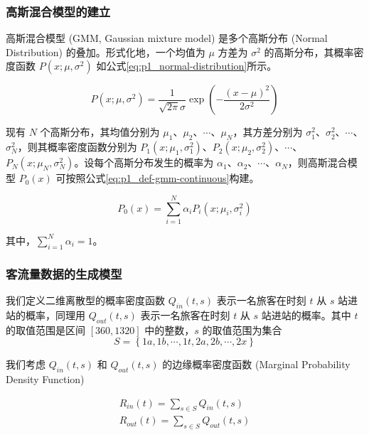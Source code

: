 \documentclass[12pt,a4paper]{mcmthesis}
\begin{document}
    \subsubsection{高斯混合模型的建立}

    高斯混合模型 (GMM, Gaussian mixture model) 是多个高斯分布 (Normal Distribution) 的叠加。形式化地，一个均值为 $\mu$ 方差为 $\sigma^2$ 的高斯分布，其概率密度函数 $P(x;\mu,\sigma^2)$ 如公式\ref{eq:p1_normal-distribution}所示。

    \begin{equation}
        P(x;\mu,\sigma^2) = \frac{1}{\sqrt{2\pi}\sigma} \exp \left( - \frac{(x-\mu)^2}{2\sigma^2} \right)
        \label{eq:p1_normal-distribution}
    \end{equation}

    现有 $N$ 个高斯分布，其均值分别为 $\mu_1$、$\mu_2$、$\cdots$、$\mu_N$，其方差分别为 $\sigma^2_1$、$\sigma^2_2$、$\cdots$、$\sigma^2_N$，则其概率密度函数分别为 $P_1(x;\mu_1,\sigma^2_1)$、$P_2(x;\mu_2,\sigma^2_2)$、$\cdots$、$P_N(x;\mu_N,\sigma^2_N)$。设每个高斯分布发生的概率为 $\alpha_1$、$\alpha_2$、$\cdots$、$\alpha_N$，则高斯混合模型 $P_0(x)$ 可按照公式\ref{eq:p1_def-gmm-continuous}构建。

    \begin{equation}
        P_0(x) = \sum_{i=1}^{N} \alpha_i P_i(x;\mu_i,\sigma^2_i)
        \label{eq:p1_def-gmm-continuous}
    \end{equation}

    其中，$\sum_{i=1}^{N} \alpha_i=1$。

    \subsubsection{客流量数据的生成模型}

    我们定义二维离散型的概率密度函数 $Q_{in}(t,s)$ 表示一名旅客在时刻 $t$ 从 $s$ 站进站的概率，同理用 $Q_{out}(t,s)$ 表示一名旅客在时刻 $t$ 从 $s$ 站进站的概率。其中 $t$ 的取值范围是区间 $[360,1320]$ 中的整数，$s$ 的取值范围为集合
    \[ S = \left\{ 1a,1b,\cdots,1t,2a,2b,\cdots,2x \right\} \]

    我们考虑 $Q_{in}(t,s)$ 和 $Q_{out}(t,s)$ 的边缘概率密度函数 (Marginal Probability Density Function)

    \begin{equation*}
        \begin{aligned}
            R_{in}(t) = \sum_{s \in S} Q_{in}(t,s) \\
            R_{out}(t) = \sum_{s \in S} Q_{out}(t,s)
        \end{aligned}
    \end{equation*}
\end{document}
